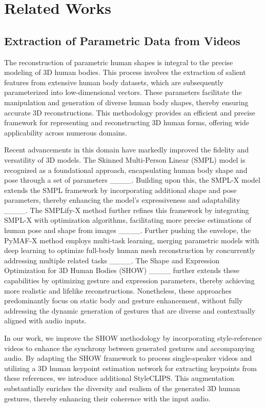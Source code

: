 \section{Related Works}
\subsection{Extraction of Parametric Data from Videos}
The reconstruction of parametric human shapes is integral to the precise modeling of 3D human bodies. This process involves the extraction of salient features from extensive human body datasets, which are subsequently parameterized into low-dimensional vectors. These parameters facilitate the manipulation and generation of diverse human body shapes, thereby ensuring accurate 3D reconstructions. This methodology provides an efficient and precise framework for representing and reconstructing 3D human forms, offering wide applicability across numerous domains.

Recent advancements in this domain have markedly improved the fidelity and versatility of 3D models. The Skinned Multi-Person Linear (SMPL) model is recognized as a foundational approach, encapsulating human body shape and pose through a set of parameters ____. Building upon this, the SMPL-X model extends the SMPL framework by incorporating additional shape and pose parameters, thereby enhancing the model's expressiveness and adaptability ____. The SMPLify-X method further refines this framework by integrating SMPL-X with optimization algorithms, facilitating more precise estimations of human pose and shape from images ____. Further pushing the envelope, the PyMAF-X method employs multi-task learning, merging parametric models with deep learning to optimize full-body human mesh reconstruction by concurrently addressing multiple related tasks ____. The Shape and Expression Optimization for 3D Human Bodies (SHOW) ____ further extends these capabilities by optimizing gesture and expression parameters, thereby achieving more realistic and lifelike reconstructions. Nonetheless, these approaches predominantly focus on static body and gesture enhancement, without fully addressing the dynamic generation of gestures that are diverse and contextually aligned with audio inputs.

In our work, we improve the SHOW methodology by incorporating style-reference videos to enhance the synchrony between generated gestures and accompanying audio. By adapting the SHOW framework to process single-speaker videos and utilizing a 3D human keypoint estimation network for extracting keypoints from these references, we introduce additional StyleCLIPS. This augmentation substantially enriches the diversity and realism of the generated 3D human gestures, thereby enhancing their coherence with the input audio.

